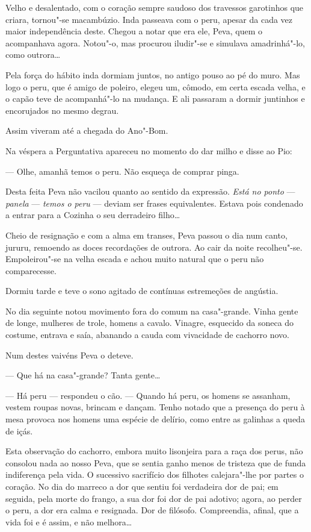 Velho e desalentado, com o coração sempre saudoso dos travessos
garotinhos que criara, tornou"-se macambúzio. Inda passeava com o peru,
apesar da cada vez maior independência deste. Chegou a notar que era
ele, Peva, quem o acompanhava agora. Notou"-o, mas procurou iludir"-se e
simulava amadrinhá"-lo, como outrora\ldots{}

Pela força do hábito inda dormiam juntos, no antigo pouso ao pé do muro.
Mas logo o peru, que é amigo de poleiro, elegeu um, cômodo, em certa
escada velha, e o capão teve de acompanhá"-lo na mudança. E ali passaram
a dormir juntinhos e encorujados no mesmo degrau.

Assim viveram até a chegada do Ano"-Bom.

Na véspera a Perguntativa apareceu no momento do dar milho e disse ao
Pio:

--- Olhe, amanhã temos o peru. Não esqueça de comprar pinga.

Desta feita Peva não vacilou quanto ao sentido da expressão. \emph{Está
no ponto} --- \emph{panela} --- \emph{temos o peru} --- deviam ser
frases equivalentes. Estava pois condenado a entrar para a Cozinha o seu
derradeiro filho\ldots{}

Cheio de resignação e com a alma em transes, Peva passou o dia num
canto, jururu, remoendo as doces recordações de outrora. Ao cair da
noite recolheu"-se. Empoleirou"-se na velha escada e achou muito natural
que o peru não comparecesse.

Dormiu tarde e teve o sono agitado de contínuas estremeções de angústia.

No dia seguinte notou movimento fora do comum na casa"-grande. Vinha
gente de longe, mulheres de trole, homens a cavalo. Vinagre, esquecido
da soneca do costume, entrava e saía, abanando a cauda com vivacidade de
cachorro novo.

Num destes vaivéns Peva o deteve.

--- Que há na casa"-grande? Tanta gente\ldots{}

--- Há peru --- respondeu o cão. --- Quando há peru, os homens se
assanham, vestem roupas novas, brincam e dançam. Tenho notado que a
presença do peru à mesa provoca nos homens uma espécie de delírio, como
entre as galinhas a queda de içás.

Esta observação do cachorro, embora muito lisonjeira para a raça dos
perus, não consolou nada ao nosso Peva, que se sentia ganho menos de
tristeza que de funda indiferença pela vida. O sucessivo sacrifício dos
filhotes calejara"-lhe por partes o coração. No dia do marreco a dor que
sentiu foi verdadeira dor de pai; em seguida, pela morte do frango, a
sua dor foi dor de pai adotivo; agora, ao perder o peru, a dor era calma
e resignada. Dor de filósofo. Compreendia, afinal, que a vida foi e é
assim, e não melhora\ldots{}

